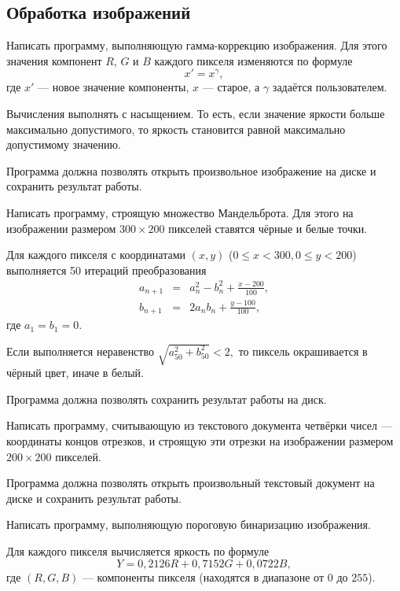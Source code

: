 
\subsection{Обработка изображений}

\task Написать программу, выполняющую гамма-коррекцию
изображения. Для этого значения
компонент $R$, $G$ и $B$ каждого пикселя изменяются по формуле
\[
x'=x^{\gamma},
\]
где $x'$ — новое значение компоненты, $x$ — старое, а $\gamma$
задаётся пользователем.

Вычисления выполнять с насыщением. То есть, если значение яркости
больше максимально допустимого, то яркость становится равной
максимально допустимому значению.

Программа должна позволять открыть произвольное изображение на диске и
сохранить результат работы.

\task Написать программу, строящую множество
Мандельброта. Для этого на изображении
размером $300 \times 200$ пикселей ставятся чёрные и белые точки.

Для каждого пикселя с координатами $(x, y)$
($0\leqslant x < 300, 0\leqslant y < 200$) выполняется 50 итераций
преобразования
\begin{eqnarray*}
a_{n+1} &=& a_n^2 - b_n^2 + \frac{x - 200}{100},\\
b_{n+1} &=& 2 a_n b_n + \frac{y-100}{100},
\end{eqnarray*}
где $a_1=b_1=0.$

Если выполняется неравенство $\sqrt{a_{50}^2 + b_{50}^2} < 2,$ то
пиксель окрашивается в чёрный цвет, иначе в белый.

Программа должна позволять сохранить результат работы на диск.

\task Написать программу, считывающую из текстового документа четвёрки
чисел — координаты концов отрезков, и строящую эти отрезки на изображении
размером $200\times 200$ пикселей.

Программа должна позволять открыть произвольный текстовый документ на
диске и сохранить результат работы.

\task Написать программу, выполняющую пороговую бинаризацию
изображения.

Для каждого пикселя вычисляется яркость по формуле
\[
Y = 0{,}2126 R + 0{,}7152 G + 0{,}0722 B,
\]
где $(R, G, B)$ — компоненты пикселя (находятся в диапазоне от $0$ до
$255$).

